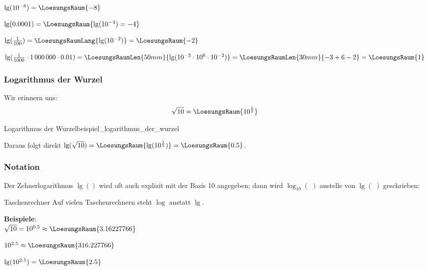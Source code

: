 $\lg(10^{-8}) = \LoesungsRaum{-8}$
\leserluft{}

$\lg(0.0001) = \LoesungsRaum{\lg(10^{-4})=-4}$

$\lg(\frac1{100}) =\LoesungsRaumLang{\lg(10^{-2}) } = \LoesungsRaum{-2}$
\leserluft{}

$\lg(\frac1{1000}\cdot{} 1\,000\,000 \cdot{} 0.01)
=\LoesungsRaumLen{50mm}{\lg(10^{-3} \cdot{} 10^6 \cdot{} 10^{-2}) } =
\LoesungsRaumLen{30mm}{-3 + 6 - 2} = \LoesungsRaum{1}$

\newpage
\subsubsection{Logarithmus der Wurzel}
Wir erinnern uns: $$\sqrt{10} =\LoesungsRaum{ 10^\frac12}$$
\begin{beispiel}{Logarithmus der
    Wurzel}{beispiel_logarithmus_der_wurzel}

  Daraus folgt direkt $\lg(\sqrt{10}) = \LoesungsRaum{\lg(10^\frac12)}  = \LoesungsRaum{0.5}$.
\end{beispiel}

\subsubsection{Notation}
Der Zehnerlogarithmus $\lg()$ wird oft auch explizit mit der Basis 10
angegeben; dann wird $\log_{10}(\,\,)$ anstelle von $\lg(\,\,)$ geschrieben:

\begin{center}
\end{center}

\begin{bemerkung}{Taschenrechner}{}
  Auf vielen Taschenrechnern steht $\log$ anstatt $\lg$.

  \end{bemerkung}


\textbf{Beispiele}:\\


$\sqrt{10} = 10^{0.5} \approx \LoesungsRaum{3.16227766}$
\leserluft{}

$10^{2.5} \approx \LoesungsRaum{316.227766}$\\
\leserluft{}

$\lg(10^{2.5}) = \LoesungsRaum{2.5}$

\leserluft{}

